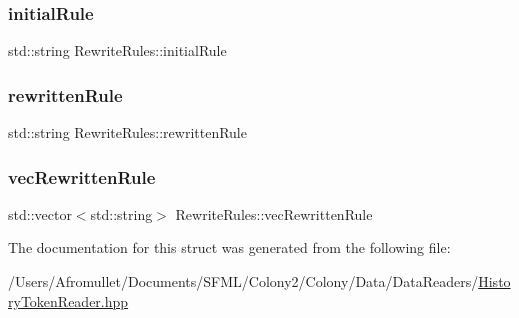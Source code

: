 \subsubsection{\texorpdfstring{initial\+Rule}{initialRule}}
{\footnotesize\ttfamily std\+::string Rewrite\+Rules\+::initial\+Rule}

\mbox{\label{struct_rewrite_rules_a8b43af4c21fe8159a6f2ff51292830fe}} 
\subsubsection{\texorpdfstring{rewritten\+Rule}{rewrittenRule}}
{\footnotesize\ttfamily std\+::string Rewrite\+Rules\+::rewritten\+Rule}

\mbox{\label{struct_rewrite_rules_ae4d826d219e89b6d6d09aee82c45294d}} 
\subsubsection{\texorpdfstring{vec\+Rewritten\+Rule}{vecRewrittenRule}}
{\footnotesize\ttfamily std\+::vector$<$std\+::string$>$ Rewrite\+Rules\+::vec\+Rewritten\+Rule}



The documentation for this struct was generated from the following file\+:\begin{DoxyCompactItemize}
\item 
/\+Users/\+Afromullet/\+Documents/\+S\+F\+M\+L/\+Colony2/\+Colony/\+Data/\+Data\+Readers/\mbox{\hyperlink{_history_token_reader_8hpp}{History\+Token\+Reader.\+hpp}}\end{DoxyCompactItemize}
